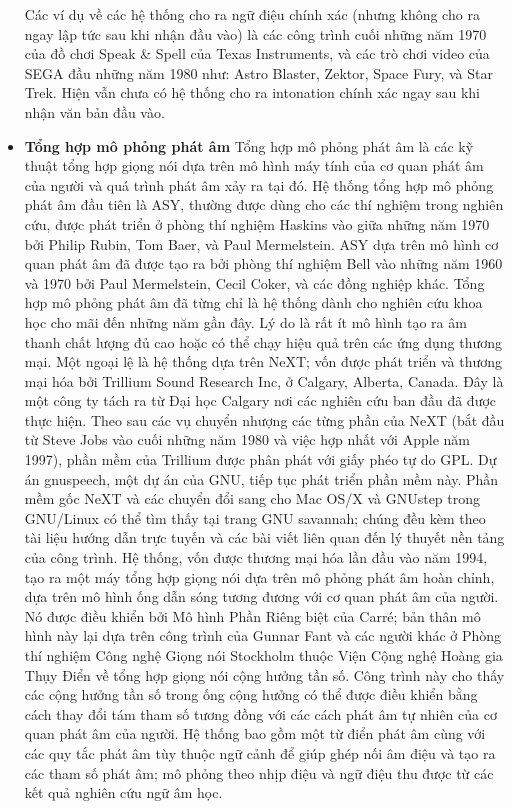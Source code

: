 \begin{itemize}
Các ví dụ về các hệ thống cho ra ngữ điệu chính xác (nhưng không cho ra ngay lập tức sau khi nhận đầu vào) là các công trình cuối những năm 1970 của đồ chơi Speak \& Spell của Texas Instruments, và các trò chơi video của SEGA đầu những năm 1980 như: Astro Blaster, Zektor, Space Fury, và Star Trek. Hiện vẫn chưa có hệ thống cho ra intonation chính xác ngay sau khi nhận văn bản đầu vào.

\item \textbf{Tổng hợp mô phỏng phát âm}
Tổng hợp mô phỏng phát âm là các kỹ thuật tổng hợp giọng nói dựa trên mô hình máy tính của cơ quan phát âm của người và quá trình phát âm xảy ra tại đó. Hệ thống tổng hợp mô phỏng phát âm đầu tiên là ASY, thường được dùng cho các thí nghiệm trong nghiên cứu, được phát triển ở phòng thí nghiệm Haskins vào giữa những năm 1970 bởi Philip Rubin, Tom Baer, và Paul Mermelstein. ASY dựa trên mô hình cơ quan phát âm đã được tạo ra bởi phòng thí nghiệm Bell vào những năm 1960 và 1970 bởi Paul Mermelstein, Cecil Coker, và các đồng nghiệp khác. Tổng hợp mô phỏng phát âm đã từng chỉ là hệ thống dành cho nghiên cứu khoa học cho mãi đến những năm gần đây. Lý do là rất ít mô hình tạo ra âm thanh chất lượng đủ cao hoặc có thể chạy hiệu quả trên các ứng dụng thương mại. Một ngoại lệ là hệ thống dựa trên NeXT; vốn được phát triển và thương mại hóa bởi Trillium Sound Research Inc, ở Calgary, Alberta, Canada. Đây là một công ty tách ra từ Đại học Calgary nơi các nghiên cứu ban đầu đã được thực hiện. Theo sau các vụ chuyển nhượng các từng phần của NeXT (bắt đầu từ Steve Jobs vào cuối những năm 1980 và việc hợp nhất với Apple năm 1997), phần mềm của Trillium được phân phát với giấy phéo tự do GPL. Dự án gnuspeech, một dự án của GNU, tiếp tục phát triển phần mềm này. Phần mềm gốc NeXT và các chuyển đổi sang cho Mac OS/X và GNUstep trong GNU/Linux có thể tìm thấy tại trang GNU savannah; chúng đều kèm theo tài liệu hướng dẫn trực tuyến và các bài viết liên quan đến lý thuyết nền tảng của công trình. Hệ thống, vốn được thương mại hóa lần đầu vào năm 1994, tạo ra một máy tổng hợp giọng nói dựa trên mô phỏng phát âm hoàn chỉnh, dựa trên mô hình ống dẫn sóng tương đương với cơ quan phát âm của người. Nó được điều khiển bởi Mô hình Phần Riêng biệt của Carré; bản thân mô hình này lại dựa trên công trình của Gunnar Fant và các người khác ở Phòng thí nghiệm Công nghệ Giọng nói Stockholm thuộc Viện Cộng nghệ Hoàng gia Thụy Điển về tổng hợp giọng nói cộng hưởng tần số. Công trình này cho thấy các cộng hưởng tần số trong ống cộng hưởng có thể được điều khiển bằng cách thay đổi tám tham số tương đồng với các cách phát âm tự nhiên của cơ quan phát âm của người. Hệ thống bao gồm một từ điển phát âm cùng với các quy tắc phát âm tùy thuộc ngữ cảnh để giúp ghép nối âm điệu và tạo ra các tham số phát âm; mô phỏng theo nhịp điệu và ngữ điệu thu được từ các kết quả nghiên cứu ngữ âm học.


\end{itemize}
